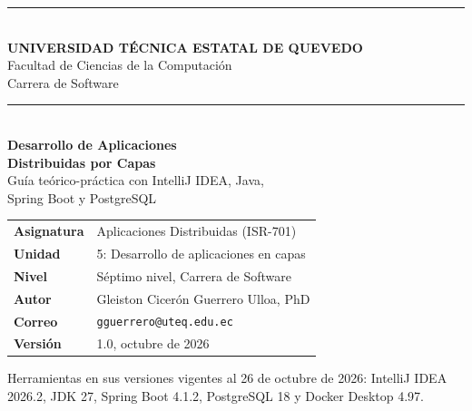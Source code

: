 \begin{titlepage}
	\centering
	\vspace*{0.3cm}
	{\color{uteqBlue}\rule{\linewidth}{1.2pt}}\\[0.35cm]
	{\Large\bfseries\color{uteqBlue} UNIVERSIDAD TÉCNICA ESTATAL DE QUEVEDO}\\[0.2cm]
	{\large Facultad de Ciencias de la Computación}\\[0.1cm]
	{\large Carrera de Software}\\[0.35cm]
	{\color{uteqBlue}\rule{\linewidth}{1.2pt}}\\[2.2cm]
	{\Huge\bfseries\color{uteqBlue} Desarrollo de Aplicaciones}\\[0.3cm]
	{\Huge\bfseries\color{uteqBlue} Distribuidas por Capas}\\[0.8cm]
	{\Large Guía teórico-práctica con IntelliJ IDEA, Java,}\\[0.15cm]
	{\Large Spring Boot y PostgreSQL}\\[1.6cm]
	\begin{tcolorbox}[enhanced,colback=uteqSoft,colframe=uteqBlue,boxrule=0.8pt,arc=3pt,width=0.84\linewidth,left=8pt,right=8pt]
		\small
		\begin{tabularx}{\linewidth}{@{}L{4.0cm}Y@{}}
			\textbf{Asignatura} & Aplicaciones Distribuidas (ISR-701) \\
			\textbf{Unidad} & 5: Desarrollo de aplicaciones en capas \\
			\textbf{Nivel} & Séptimo nivel, Carrera de Software \\
			\textbf{Autor} & Gleiston Cicerón Guerrero Ulloa, PhD \\
			\textbf{Correo} & \texttt{gguerrero@uteq.edu.ec} \\
			\textbf{Versión} & 1.0, octubre de 2026 \\
		\end{tabularx}
	\end{tcolorbox}
	\vfill
	{\small\color{uteqBlue} Herramientas en sus versiones vigentes al 26 de octubre de 2026: IntelliJ IDEA 2026.2, JDK 27, Spring Boot 4.1.2, PostgreSQL 18 y Docker Desktop 4.97.}
\end{titlepage}
